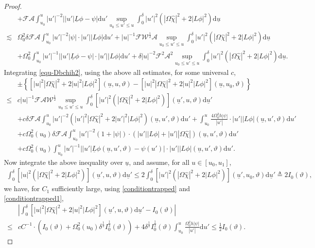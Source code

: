 \documentclass[11pt,reqno]{amsart}
\theoremstyle{definition}
\numberwithin{equation}{section}
\newcommand{\D}{\mathrm{d}}
\def\chih{\widehat{\chi}}
\def\Lb{\underline{L}}
\def\ub{\underline{u}}
\begin{document}
\begin{proof}
\begin{align*}
&+\mathscr{F}\mathcal{A}\int_{u_0}^u|u'|^{-2}||u'|\Lb\phi-\psi|\D u'\sup_{u_0\le u'\le u}\int_0^{\delta}|u'|^2(|\Omega\chih|^2+2|L\phi|^2)\D\ub\\
\lesssim&\Omega_0^2\delta\mathscr{F}\mathcal{A}\int_{u_0}^u|u'|^{-2}|\psi|\cdot|u'||L\phi|\D u'+|u|^{-1}\mathscr{F}\mathscr{W}^{\frac{1}{2}}\mathcal{A}\sup_{u_0\le u'\le u}\int_0^{\delta}|u'|^2(|\Omega\chih|^2+2|L\phi|^2)\D\ub\\
&+\Omega_0^2\int_{u_0}^u|u'|^{-1}||u'|\Lb\phi-\psi|\cdot|u'||L\phi|\D u'+\delta|u|^{-2}\mathscr{F}^2\mathcal{A}^2\sup_{u_0\le u'\le u}\int_0^{\delta}|u'|^2(|\Omega\chih|^2+2|L\phi|^2)\D\ub.
\end{align*}
Integrating \eqref{equ-Dbchih2}, using the above all estimates, for some universal $c$,
\begin{align*}
&\pm\left\{[|u|^2|\Omega\chih|^2+2|u|^2|L\phi|^2](\ub,u,\vartheta)-[|u|^2|\Omega\chih|^2+2|u|^2|L\phi|^2](\ub,u_0,\vartheta)\right\}\\
\le&c|u|^{-1}\mathscr{F}\mathcal{A}\mathscr{W}^{\frac{1}{2}}\sup_{u_0\le u'\le u}\int_0^{\delta}[|u'|^2(|\Omega\chih|^2+2|L\phi|^2)](\ub',u,\vartheta)\D\ub'\\
&+c\delta\mathscr{F}\mathcal{A}\int_{u_0}^u|u'|^{-2}(|u'|^2|\Omega\chih|^2+2|u'|^2|L\phi|^2)(\ub,u',\vartheta)\D u'+\int_{u_0}^u\frac{4\Omega_0^2h|\psi|}{|u'|}\cdot|u'||L\phi|(\ub,u',\vartheta)\D u'\\
&+c\Omega_0^2(u_0)\delta\mathscr{F}\mathcal{A}\int_{u_0}^u|u'|^{-2}(1+|\psi|)\cdot(|u'||L\phi|+|u'||\Omega\chih|)(\ub,u',\vartheta)\D u'\\
&+c\Omega_0^2(u_0)\int_{u_0}^u|u'|^{-1}||u'|\Lb\phi(\ub,u',\vartheta)-\psi(u')|\cdot|u'||L\phi|(\ub,u',\vartheta)\D u'.
\end{align*}
Now integrate the above inequality over $\ub$, and assume, for all $u\in[u_0,u_1]$,
\begin{align}\label{bootstrap-energy}
\int_0^{\delta}[|u|^2(|\Omega\chih|^2+2|L\phi|^2)](\ub',u,\vartheta)\D\ub'\le2\int_0^{\delta}[|u'|^2(|\Omega\chih|^2+2|L\phi|^2)](\ub',u_0,\vartheta)\D\ub'\triangleq 2I_0(\vartheta),
\end{align}
we have, for $C_1$ sufficiently large, using \eqref{conditiontrapped} and \eqref{conditiontrapped1},
\begin{align*}
&\left|\int_0^\delta[|u|^2|\Omega\chih|^2+2|u|^2|L\phi|^2](\ub',u,\vartheta)\D\ub'-I_0(\vartheta)\right|\\
\le& cC^{-1}\cdot (I_0(\vartheta)+\Omega_0^2(u_0)\delta^{\frac{1}{2}}I_0^{\frac{1}{2}}(\vartheta))+4\delta^{\frac{1}{2}}I_0^{\frac{1}{2}}(\vartheta)\int_{u_0}^u\frac{\Omega_0^2h|\psi|}{|u'|}\D u'\le\frac{1}{2}I_0(\vartheta).\end{align*}

\end{proof}
\end{document}
